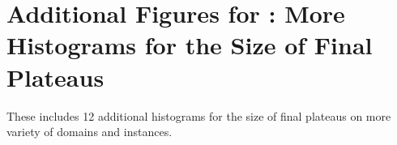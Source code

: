 % 


\clearpage
\section[Additional Figures for \refig{fig:depth-histogram}]{Additional Figures for : More Histograms for the Size of Final Plateaus}

These includes 12 additional histograms for the size of final plateaus on
more variety of domains and instances.


